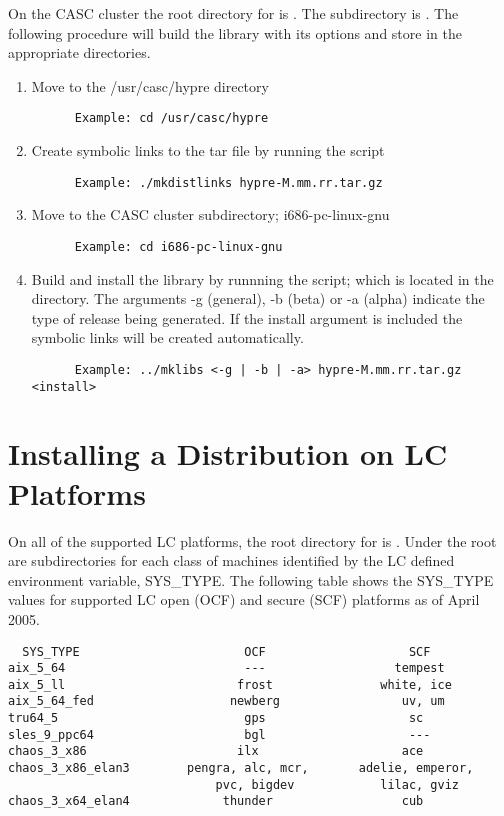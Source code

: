 On the CASC cluster the root directory for \hypre{} is .  The 
subdirectory is . The following procedure will build the 
library with its options and store in the appropriate directories.

\begin{enumerate}
\item Move to the /usr/casc/hypre directory
\begin{verbatim}
      Example: cd /usr/casc/hypre
\end{verbatim}
\item Create symbolic links to the tar file by running the  script
\begin{verbatim}
      Example: ./mkdistlinks hypre-M.mm.rr.tar.gz
\end{verbatim}
\item Move to the CASC cluster subdirectory; i686-pc-linux-gnu
\begin{verbatim}
      Example: cd i686-pc-linux-gnu
\end{verbatim}
\item Build and install the library by runnning the  script; which is
         located in the  directory.
      The arguments -g (general), -b (beta) or -a (alpha) indicate the type of 
          release being generated.  If the install argument is included the 
          symbolic links will be created automatically.
\begin{verbatim}
      Example: ../mklibs <-g | -b | -a> hypre-M.mm.rr.tar.gz <install>
\end{verbatim}
\end{enumerate}

\section{Installing a Distribution on LC Platforms}
\label{Installing a Distribution on LC Platforms}

On all of the supported LC platforms, the root directory for \hypre{} is 
.  Under the root are subdirectories for each class 
of machines identified by the LC defined environment variable, SYS\_TYPE.
The following table shows the SYS\_TYPE values for supported LC open (OCF) 
and secure (SCF) platforms as of April 2005.

\begin{verbatim}
  SYS_TYPE                       OCF                    SCF
aix_5_64                         ---                  tempest
aix_5_ll                        frost               white, ice
aix_5_64_fed                   newberg                 uv, um
tru64_5                          gps                    sc
sles_9_ppc64                     bgl                    ---
chaos_3_x86                     ilx                    ace
chaos_3_x86_elan3        pengra, alc, mcr,       adelie, emperor,
                             pvc, bigdev            lilac, gviz
chaos_3_x64_elan4             thunder                  cub
\end{verbatim}

